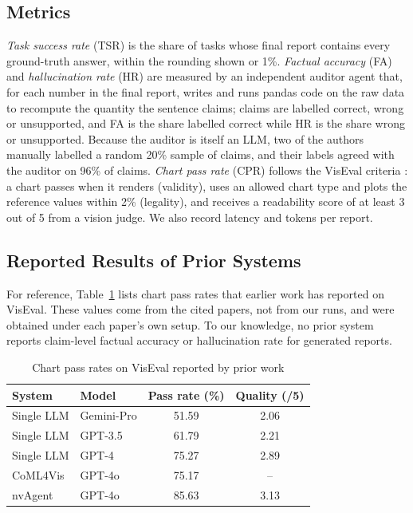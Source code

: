 \documentclass[conference]{IEEEtran}
\newcommand{\res}[1]{\textcolor{red}{#1}}
\newcommand{\AGREEMENT}{\res{96}}    %
\renewcommand{\res}[1]{#1}   %
\begin{document}
\subsection{Metrics}
\textit{Task success rate} (TSR) is the share of tasks whose final report contains every ground-truth answer, within the rounding shown or 1\%. \textit{Factual accuracy} (FA) and \textit{hallucination rate} (HR) are measured by an independent auditor agent that, for each number in the final report, writes and runs pandas code on the raw data to recompute the quantity the sentence claims; claims are labelled correct, wrong or unsupported, and FA is the share labelled correct while HR is the share wrong or unsupported. Because the auditor is itself an LLM, two of the authors manually labelled a random 20\% sample of claims, and their labels agreed with the auditor on \AGREEMENT{}\% of claims. \textit{Chart pass rate} (CPR) follows the VisEval criteria \cite{chen2025viseval}: a chart passes when it renders (validity), uses an allowed chart type and plots the reference values within 2\% (legality), and receives a readability score of at least 3 out of 5 from a vision judge. We also record latency and tokens per report.

\subsection{Reported Results of Prior Systems}
For reference, Table~\ref{tab:prior} lists chart pass rates that earlier work has reported on VisEval. These values come from the cited papers, not from our runs, and were obtained under each paper's own setup. To our knowledge, no prior system reports claim-level factual accuracy or hallucination rate for generated reports.

\begin{table}[t]
\centering
\caption{Chart pass rates on VisEval reported by prior work}
\label{tab:prior}
\setlength{\tabcolsep}{4pt}
\begin{tabular}{@{}llcc@{}}
\toprule
System & Model & Pass rate (\%) & Quality (/5) \\
\midrule
Single LLM \cite{chen2025viseval} & Gemini-Pro & 51.59 & 2.06 \\
Single LLM \cite{chen2025viseval} & GPT-3.5    & 61.79 & 2.21 \\
Single LLM \cite{chen2025viseval} & GPT-4      & 75.27 & 2.89 \\
CoML4Vis \cite{nvagent2025}       & GPT-4o     & 75.17 & --   \\
nvAgent \cite{nvagent2025}        & GPT-4o     & 85.63 & 3.13 \\
\bottomrule
\end{tabular}
\end{table}
\end{document}
